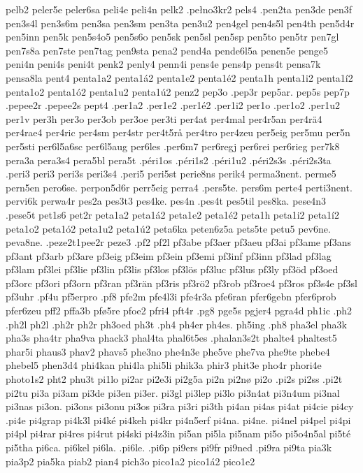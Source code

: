 {{pelb2
peler5e
peler6sa
peli4e
peli4n
pelk2
.pełno3kr2
pels4
.pen2ta
pen3de
pen3f
pen3s4l
pen3s6m
pen3sa
pen3sm
pen3ta
pen3u2
pen4gel
pen4s5l
pen4th
pen5d4r
pen5inn
pen5k
pen5s4o5
pen5s6o
pen5sk
pen5sl
pen5sp
pen5to
pen5tr
pen7gl
pen7s8a
pen7ste
pen7tag
pen9sta
pena2
pend4a
pende6l5a
penen5e
penge5
peni4n
peni4s
peni4t
penk2
penly4
penn4i
pens4e
pens4p
pens4t
pensa7k
pensa8la
pent4
penta1a2
penta1á2
penta1e2
penta1é2
penta1h
penta1i2
penta1í2
penta1o2
penta1ó2
penta1u2
penta1ú2
penz2
pep3o
.pep3r
pep5ar.
pep5s
pep7p
.pepee2r
.pepee2s
pept4
.per1a2
.per1e2
.per1é2
.per1i2
per1o
.per1o2
.per1u2
per1v
per3h
per3o
per3ob
per3oe
per3ti
per4at
per4mal
per4r5an
per4rä4
per4rae4
per4ric
per4sm
per4str
per4t5rå
per4tro
per4zeu
per5eig
per5mu
per5n
per5sti
per6l5a6sc
per6l5aug
per6les
.per6m7
per6regj
per6rei
per6rieg
per7k8
pera3a
pera3s4
pera5bl
pera5t
.péri1os
.péri1s2
.péri1u2
.péri2s3s
.péri2s3ta
.peri3
peri3
peri3s
peri3s4
.peri5
peri5st
perie8ns
perik4
perma3nent.
perme5
pern5en
pero6se.
perpon5d6r
perr5eig
perra4
.pers5te.
pers6m
perte4
perti3nent.
pervi6k
perwa4r
pes2a
pes3t3
pes4ke.
pes4n
.pes4t
pes5til
pes8ka.
pese4n3
.pese5t
pet1s6
pet2r
peta1a2
peta1á2
peta1e2
peta1é2
peta1h
peta1i2
peta1í2
peta1o2
peta1ó2
peta1u2
peta1ú2
peta6ka
peten6z5a
pets5te
petu5
pev6ne.
peva8ne.
.peze2t1pee2r
peze3
.pf2
pf2l
pf3abe
pf3aer
pf3aeu
pf3ai
pf3ame
pf3ans
pf3ant
pf3arb
pf3are
pf3eig
pf3eim
pf3ein
pf3emi
pf3inf
pf3inn
pf3lad
pf3lag
pf3lam
pf3lei
pf3lie
pf3lin
pf3lis
pf3los
pf3lös
pf3luc
pf3lus
pf3ly
pf3öd
pf3oed
pf3orc
pf3ori
pf3orn
pf3ran
pf3rän
pf3ris
pf3rö2
pf3rob
pf3roe4
pf3ros
pf3s4e
pf3sl
pf3uhr
.pf4u
pf5erpro
.pf8
pfe2m
pfe4l3i
pfe4r3a
pfe6ran
pfer6gebn
pfer6prob
pfer6zeu
pff2
pffa3b
pfø5re
pfoe2
pfri4
pft4r
.pg8
pge5s
pgjer4
pgra4d
ph1ic
.ph2
.ph2l
ph2l
.ph2r
ph2r
ph3oed
ph3t
.ph4
ph4er
ph4es.
ph5ing
.ph8
pha3el
pha3k
pha3s
pha4tr
pha9va
phack3
phal4ta
phal6t5es
.phalan3s2t
phalte4
phaltest5
phar5i
phaus3
phav2
phavs5
phe3no
phe4n3e
phe5ve
phe7va
phe9te
phebe4
phebel5
phen3d4
phi4kan
phi4la
phi5li
phik3a
phir3
phit3e
pho4r
phori4e
photo1s2
pht2
phu3t
pi1lo
pi2ar
pi2e3i
pi2g5a
pi2n
pi2nø
pi2o
.pi2s
pi2ss
.pi2t
pi2tu
pi3a
pi3am
pi3de
pi3en
pi3er.
pi3gl
pi3lep
pi3lo
pi3n4at
pi3n4um
pi3nal
pi3nas
pi3on.
pi3ons
pi3onu
pi3os
pi3ra
pi3ri
pi3th
pi4an
pi4as
pi4at
pi4cie
pi4cy
.pi4e
pi4grap
pi4k3l
pi4ké
pi4keh
pi4kr
pi4n5erf
pi4na.
pi4ne.
pi4nel
pi4pel
pi4pi
pi4pl
pi4rar
pi4res
pi4rut
pi4ski
pi4z3in
pi5an
pi5la
pi5nam
pi5o
pi5o4n5al
pi5té
pi5tha
pi6ca.
pi6kel
pi6la.
.pi6le.
.pi6p
pi9ers
pi9fr
pi9ned
.pi9ra
pi9ta
pia3k
pia3p2
pia5ka
piab2
pian4
pich3o
pico1a2
pico1á2
pico1e2
}}
